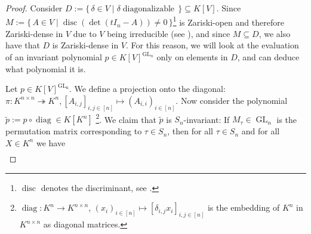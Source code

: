 \begin{proof}
  Consider $D := \{\, \delta \in V \mid \delta \operatorname{diagonalizable} \,\} \subseteq K[V]$.
  Since \linebreak$M := \{\, A \in V \mid \operatorname{disc}(\operatorname{det}(tI_n - A)) \neq 0 \,\}$\footnote{$\operatorname{disc}$ denotes the discriminant, see \cite[p.172-173]{Bos13}.} is Zariski-open and therefore Zariski-dense in $V$ due to $V$ being irreducible (see \cite[1.3.4, 1.3.5]{Gat17}), and since $M \subseteq D$, we also have that $D$ is Zariski-dense in $V$.
  For this reason, we will look at the evaluation of an invariant polynomial $p \in K[V]^{\operatorname{GL}_n} $ only on elements in $D$, and can deduce what polynomial it is.
  
  Let $p \in K[V]^{\operatorname{GL_n}}$.
  We define a projection onto the diagonal:
  \linebreak$\pi \colon K^{n \times n} \twoheadrightarrow K^n , [A_{i,j}]_{i,j \in [n]} \mapsto (A_{i,i})_{i \in [n]} $.
  Now consider the polynomial\linebreak $\tilde{p} := p \circ \operatorname{diag} \in K[K^n]$ \footnote{$\operatorname{diag} \colon K^n \rightarrow K^{n \times n}$, $(x_i)_{i\in[n]} \mapsto [\delta_{i,j}x_i]_{i,j \in [n]}$ is the embedding of $K^n$ in $K^{n\times n}$ as diagonal matrices.}.
  We claim that $\tilde{p}$ is $S_n$-invariant:
  If $M_\tau \in \operatorname{GL}_n$ is the permutation matrix corresponding to $\tau \in S_n$, then for all $\tau \in S_n$ and for all $ X \in K^n$ we have
  \begin{equation*}
    \begin{aligned}

\end{aligned}
\end{equation*}
\end{proof}
